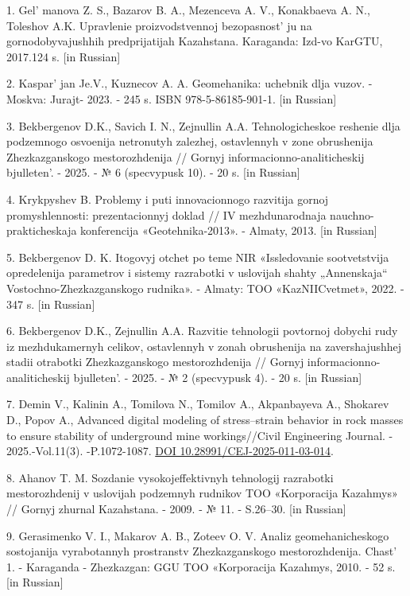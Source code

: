 \begin{refs}
1. Gel' manova Z. S., Bazarov B. A., Mezenceva A. V.,
Konakbaeva A. N., Toleshov A.K. Upravlenie proizvodstvennoj
bezopasnost' ju na gornodobyvajushhih predprijatijah
Kazahstana. Karaganda: Izd-vo KarGTU, 2017.124 s. {[}in Russian{]}

2. Kaspar' jan Je.V., Kuznecov A. A. Geomehanika:
uchebnik dlja vuzov. - Moskva: Jurajt- 2023. - 245 s. ISBN
978-5-86185-901-1. {[}in Russian{]}

3. Bekbergenov D.K., Savich I. N., Zejnullin A.A. Tehnologicheskoe
reshenie dlja podzemnogo osvoenija netronutyh zalezhej, ostavlennyh v
zone obrushenija Zhezkazganskogo mestorozhdenija // Gornyj
informacionno-analiticheskij bjulleten'. - 2025. - № 6
(specvypusk 10). - 20 s. {[}in Russian{]}

4. Krykpyshev B. Problemy i puti innovacionnogo razvitija gornoj
promyshlennosti: prezentacionnyj doklad // IV mezhdunarodnaja
nauchno-prakticheskaja konferencija «Geotehnika-2013». - Almaty, 2013.
{[}in Russian{]}

5. Bekbergenov D. K. Itogovyj otchet po teme NIR «Issledovanie
sootvetstvija opredelenija parametrov i sistemy razrabotki v uslovijah
shahty „Annenskaja`` Vostochno-Zhezkazganskogo rudnika». - Almaty: TOO
«KazNIICvetmet», 2022. - 347 s. {[}in Russian{]}

6. Bekbergenov D.K., Zejnullin A.A. Razvitie tehnologii povtornoj
dobychi rudy iz mezhdukamernyh celikov, ostavlennyh v zonah obrushenija
na zavershajushhej stadii otrabotki Zhezkazganskogo mestorozhdenija //
Gornyj informacionno-analiticheskij bjulleten'. - 2025. -
№ 2 (specvypusk 4). - 20 s. {[}in Russian{]}

7. Demin V., Kalinin A., Tomilova N., Tomilov A., Akpanbayeva A.,
Shokarev D., Popov A., Advanced digital modeling of stress--strain
behavior in rock masses to ensure stability of underground mine
workings//Civil Engineering Journal. - 2025.-Vol.11(3). -P.1072-1087.
\href{https://doi.org/10.28991/CEJ-2025-011-03-014}{DOI
10.28991/CEJ-2025-011-03-014}.

8. Ahanov T. M. Sozdanie vysokojeffektivnyh tehnologij razrabotki
mestorozhdenij v uslovijah podzemnyh rudnikov TOO «Korporacija Kazahmys»
// Gornyj zhurnal Kazahstana. - 2009. - № 11. - S.26--30. {[}in
Russian{]}

9. Gerasimenko V. I., Makarov A. B., Zoteev O. V. Analiz
geomehanicheskogo sostojanija vyrabotannyh prostranstv Zhezkazganskogo
mestorozhdenija. Chast'{} 1. - Karaganda - Zhezkazgan:
GGU TOO «Korporacija Kazahmys, 2010. - 52 s. {[}in Russian{]}


\end{refs}
